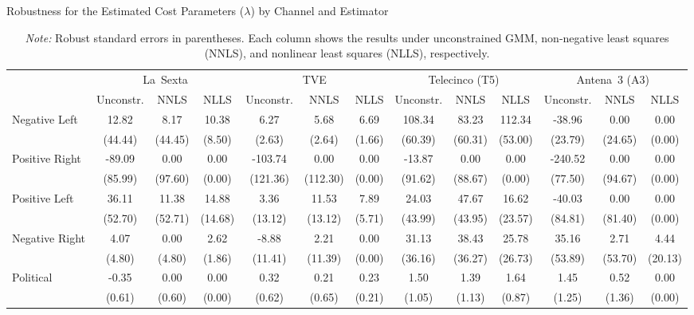 \documentclass[12pt]{article}
\begin{document}
	\begin{table}
		\caption{Robustness for the Estimated Cost Parameters ($\lambda$) by Channel and Estimator}
		\label{tab:costs_robust}
		\centering\small
		\begin{tabular}{l|ccc|ccc|ccc|ccc|}
			\toprule
			& \multicolumn{3}{c|}{La~Sexta} & \multicolumn{3}{c|}{TVE} & \multicolumn{3}{c|}{Telecinco (T5)} & \multicolumn{3}{c|}{Antena~3 (A3)} \\
			& Unconstr. & NNLS & NLLS & Unconstr. & NNLS & NLLS & Unconstr. & NNLS & NLLS & Unconstr. & NNLS & NLLS \\
			\midrule
			Negative Left & 12.82 & 8.17 & 10.38 & 6.27 & 5.68 & 6.69 & 108.34 & 83.23 & 112.34 & -38.96 & 0.00 & 0.00 \\
			& (44.44) & (44.45) & (8.50) & (2.63) & (2.64) & (1.66) & (60.39) & (60.31) & (53.00) & (23.79) & (24.65) & (0.00) \\
			\midrule
			Positive Right & -89.09 & 0.00 & 0.00 & -103.74 & 0.00 & 0.00 & -13.87 & 0.00 & 0.00 & -240.52 & 0.00 & 0.00 \\
			& (85.99) & (97.60) & (0.00) & (121.36) & (112.30) & (0.00) & (91.62) & (88.67) & (0.00) & (77.50) & (94.67) & (0.00) \\
			\midrule
			Positive Left & 36.11 & 11.38 & 14.88 & 3.36 & 11.53 & 7.89 & 24.03 & 47.67 & 16.62 & -40.03 & 0.00 & 0.00 \\
			& (52.70) & (52.71) & (14.68) & (13.12) & (13.12) & (5.71) & (43.99) & (43.95) & (23.57) & (84.81) & (81.40) & (0.00) \\
			\midrule
			Negative Right & 4.07 & 0.00 & 2.62 & -8.88 & 2.21 & 0.00 & 31.13 & 38.43 & 25.78 & 35.16 & 2.71 & 4.44 \\
			& (4.80) & (4.80) & (1.86) & (11.41) & (11.39) & (0.00) & (36.16) & (36.27) & (26.73) & (53.89) & (53.70) & (20.13) \\
			\midrule
			Political & -0.35 & 0.00 & 0.00 & 0.32 & 0.21 & 0.23 & 1.50 & 1.39 & 1.64 & 1.45 & 0.52 & 0.00 \\
			& (0.61) & (0.60) & (0.00) & (0.62) & (0.65) & (0.21) & (1.05) & (1.13) & (0.87) & (1.25) & (1.36) & (0.00) \\
			\midrule
			\bottomrule
		\end{tabular}
		\vspace{0.5em}
		\caption*{\small \emph{Note:} Robust standard errors in parentheses. Each column shows the results under unconstrained GMM, non-negative least squares (NNLS), and nonlinear least squares (NLLS), respectively. }
	\end{table}
	
\end{document}
